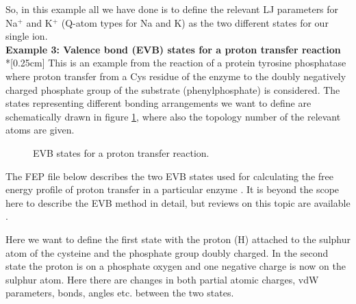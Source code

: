 \documentclass[a4paper,10pt]{article}
\newcommand{\dirfig}{./pictures}
\begin{document}
So, in  this example  all we have  done is to  define the  relevant LJ
parameters for Na$^{+}$ and K$^{+}$ (Q-atom types for Na and K) as the
two different states for our single ion.\\


\textbf{Example 3: Valence bond (EVB) states for a proton transfer
reaction}\\*[0.25cm] 
This is an example from the reaction of a protein tyrosine phosphatase
where proton transfer  from a Cys residue of the  enzyme to the doubly
negatively charged phosphate group  of the substrate (phenylphosphate)
is considered. The states  representing different bonding arrangements
we   want    to   define    are   schematically   drawn    in   figure
\ref{fig:EVB-states}, where  also the topology number  of the relevant
atoms are given.

\begin{figure}[h]
\begin{center}
\caption{EVB states for a proton transfer reaction.}
\label{fig:EVB-states}
\end{center}
\end{figure}

The FEP file below describes the two EVB states used for
calculating the free energy profile of proton transfer in a
particular enzyme \cite{Kolmodin:}. It is beyond the scope here to
describe the EVB method in detail, but reviews on this topic are
available \cite{Aaqvist:1993}.

Here we want to define the first state with the proton (H)
attached to the sulphur atom of the cysteine and the phosphate
group doubly charged. In the second state the proton is on a
phosphate oxygen and one negative charge is now on the sulphur
atom. Here there are changes in both partial atomic charges, vdW
parameters, bonds, angles etc. between the two states.
\end{document}
